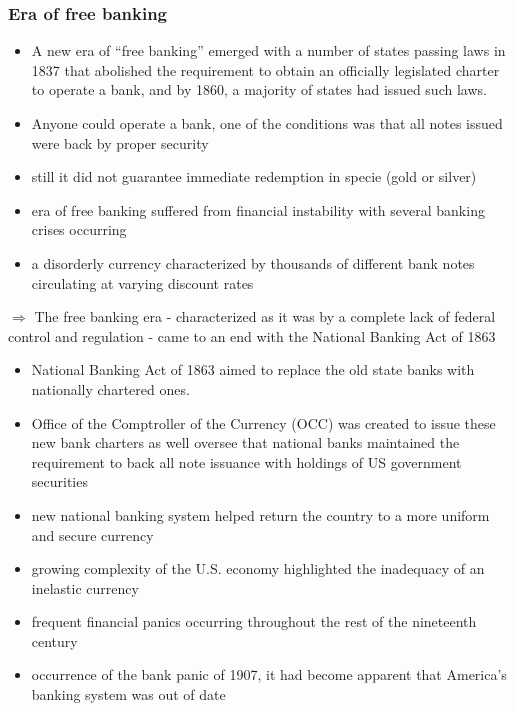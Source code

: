 \documentclass[11pt]{beamer}
\begin{document}
\begin{frame}
\frametitle {Era of free banking}
\begin{itemize}
\item A new era of “free banking” emerged with a number of states passing laws in 1837 that abolished the requirement to obtain an officially legislated charter to operate a bank, and by 1860, a majority of states had issued such laws.
\item Anyone could operate a bank, one of the conditions was that all notes issued were back by proper security
\item still it did not guarantee immediate redemption in specie (gold or silver)
\item era of free banking suffered from financial instability with several banking crises occurring
\item  a disorderly currency characterized by thousands of different bank notes circulating at varying discount rates


\end{itemize}
$\Rightarrow$ The free banking era - characterized as it was by a complete lack of federal control and regulation - came to an end with the National Banking Act of 1863

\end{frame}

\begin{frame}
\begin{itemize}
\item National Banking Act of 1863 aimed to replace the old state banks with nationally chartered ones.
\item Office of the Comptroller of the Currency (OCC) was created to issue these new bank charters as well oversee that national banks maintained the requirement to back all note issuance with holdings of US government securities
\item new national banking system helped return the country to a more uniform and secure currency
\item growing complexity of the U.S. economy highlighted the inadequacy of an inelastic currency
\item frequent financial panics occurring throughout the rest of the nineteenth century
\item occurrence of the bank panic of 1907, it had become apparent that America’s banking system was out of date





\end{itemize}
\end{frame}
\end{document}
